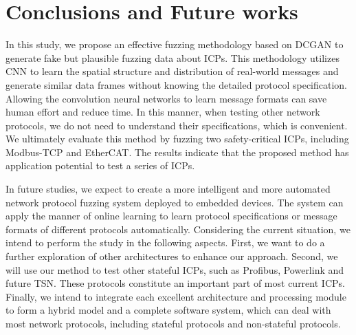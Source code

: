 \section{Conclusions and Future works}
In this study, we propose an effective fuzzing methodology based on DCGAN to generate fake but plausible fuzzing data about ICPs. This methodology utilizes CNN to learn the spatial structure and distribution of real-world messages and generate similar data frames without knowing the detailed protocol specification. Allowing the convolution neural networks to learn message formats can save human effort and reduce time. In this manner, when testing other network protocols, we do not need to understand their specifications, which is convenient. We ultimately evaluate this method by fuzzing two safety-critical ICPs, including Modbus-TCP and EtherCAT. The results indicate that the proposed method has application potential to test a series of ICPs.

In future studies, we expect to create a more intelligent and more automated network protocol fuzzing system deployed to embedded devices. The system can apply the manner of online learning to learn protocol specifications or message formats of different protocols automatically. Considering the current situation, we intend to perform the study in the following aspects. First, we want to do a further exploration of other architectures to enhance our approach. Second, we will use our method to test other stateful ICPs, such as Profibus, Powerlink and future TSN. These protocols constitute an important part of most current ICPs. Finally, we intend to integrate each excellent architecture and processing module to form a hybrid model and a complete software system, which can deal with most network protocols, including stateful protocols and non-stateful protocols.